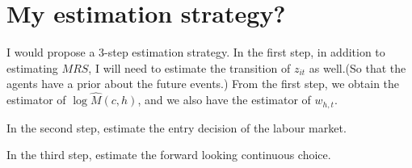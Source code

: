 \section{My estimation strategy?}
I would propose a 3-step estimation strategy.
In the first step, in addition to estimating $MRS$, I will need to estimate the transition of $z_{it}$ as well.(So that the agents have a prior about the future events.)
From the first step, we obtain the estimator of $\log \hat{M}(c,h)$, and we also have the estimator of $w_{h,t}$.

In the second step, estimate the entry decision of the labour market.

In the third step, estimate the forward looking continuous choice.

